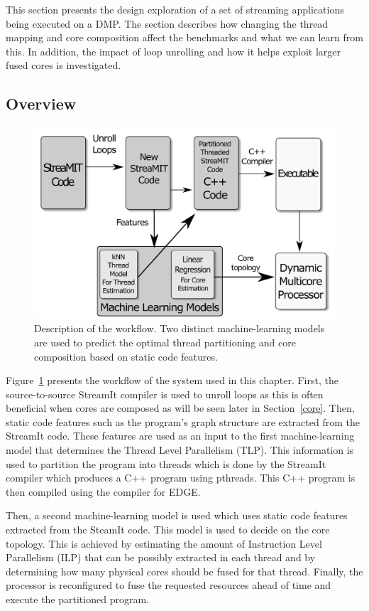 This section presents the design exploration of a set of streaming applications being executed on a DMP.
The section describes how changing the thread mapping and core composition affect the benchmarks and what we can learn from this.
In addition, the impact of loop unrolling and how it helps exploit larger fused cores is investigated.

\subsection{Overview}

\begin{figure}
    \centering
    \includegraphics[width=1\textwidth]{streamit-paper/graphics/explanation.pdf}
    \caption{Description of the workflow.
    Two distinct machine-learning models are used to predict the optimal thread partitioning and core composition based on static code features.}
    \label{fig:overview}
\end{figure}

Figure~\ref{fig:overview} presents the workflow of the system used in this chapter.
First, the source-to-source StreamIt compiler is used to unroll loops as this is often beneficial when cores are composed as will be seen later in Section~\ref{core}.
Then, static code features such as the program's graph structure are extracted from the StreamIt code.
These features are used as an input to the first machine-learning model that determines the Thread Level Parallelism (TLP).
This information is used to partition the program into threads which is done by the StreamIt compiler which produces a C++ program using pthreads.
This C++ program is then compiled using the compiler for EDGE.

Then, a second machine-learning model is used which uses static code features extracted from the SteamIt code.
This model is used to decide on the core topology.
This is achieved by estimating the amount of Instruction Level Parallelism (ILP) that can be possibly extracted in each thread and by determining how many physical cores should be fused for that thread.
Finally, the processor is reconfigured to fuse the requested resources ahead of time and execute the partitioned program.


